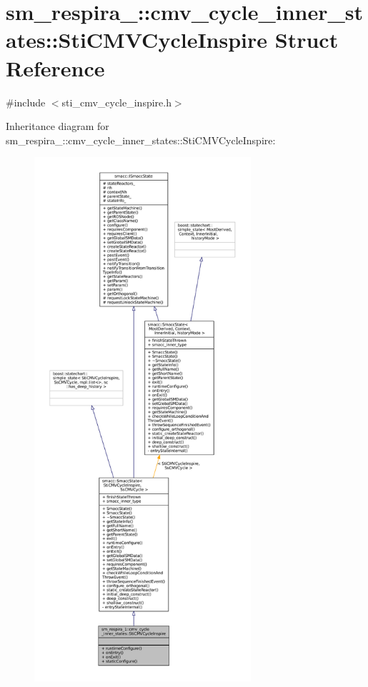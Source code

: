 \hypertarget{structsm__respira__1_1_1cmv__cycle__inner__states_1_1StiCMVCycleInspire}{}\section{sm\+\_\+respira\+\_\+:\+:cmv\+\_\+cycle\+\_\+inner\+\_\+states\+:\+:Sti\+C\+M\+V\+Cycle\+Inspire Struct Reference}
\label{structsm__respira__1_1_1cmv__cycle__inner__states_1_1StiCMVCycleInspire}


{\ttfamily \#include $<$sti\+\_\+cmv\+\_\+cycle\+\_\+inspire.\+h$>$}



Inheritance diagram for sm\+\_\+respira\+\_\+:\+:cmv\+\_\+cycle\+\_\+inner\+\_\+states\+:\+:Sti\+C\+M\+V\+Cycle\+Inspire\+:
\nopagebreak
\begin{figure}[H]
\begin{center}
\leavevmode
\includegraphics[height=550pt]{structsm__respira__1_1_1cmv__cycle__inner__states_1_1StiCMVCycleInspire__inherit__graph}
\end{center}
\end{figure}


